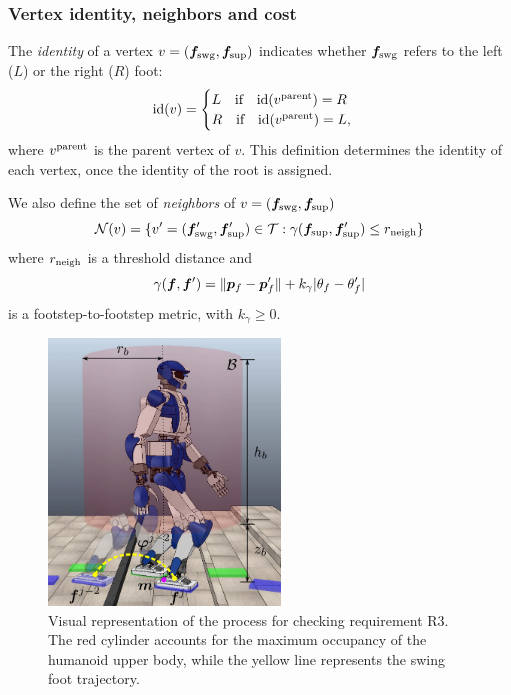\medskip

\subsubsection{Vertex identity, neighbors and cost}
\label{sec:WoS:offlineCase:FP:CostFunctions}
The {\em identity} of a vertex $v=({\bm{f}}_{\rm swg}, {\bm{f}}_{\rm sup})$ indicates
whether  ${\bm{f}}_{\rm swg}$ refers to the left ($L$) or the right ($R$) foot:
\[
{\rm id}(v)=
\begin{cases}
L\quad \mbox{if} \quad{\rm id}(v^{\rm parent}) = R \\
R\quad \mbox{if} \quad{\rm id}(v^{\rm parent}) = L,
\end{cases}
\]
where $v^{\rm parent}$ is the parent vertex of $v$.
This definition determines the identity of each vertex, once the identity of
the root is assigned.

We also define the set of {\em neighbors} of $v=({\bm{f}}_{\rm swg}, {\bm{f}}_{\rm sup})$
\[
{\cal N}(v) = \{ v'=({\bm{f}}'_{\rm swg}, {\bm{f}}'_{\rm sup}) \in {\cal T} : 
 \gamma({\bm{f}}_{\rm sup}, {\bm{f}}'_{\rm sup}) \le r_{\rm neigh}\}
\]
where $r_{\rm neigh}$ is a threshold distance and
\begin{equation}
\gamma({\bm{f}}, {\bm{f}}') = \lVert {\bm{p}}_f - {\bm{p}}_f' \rVert + k_{\gamma}|\theta_f-\theta_f'|
\label{eq:WoS:footstepToFootstepMetric}
\end{equation}
is a footstep-to-footstep metric, with $k_{\gamma}\ge 0$.

\begin{figure}
\centering
\includegraphics[width=0.55\textwidth]{figures/R3_CollisionCheck.png}
\caption{Visual representation of the process for checking requirement R3.
The red cylinder accounts for the maximum occupancy of the humanoid upper body,
while the yellow line represents the swing foot trajectory.}
\label{fig:WoS:ReqCollisionCheck}
\end{figure}

